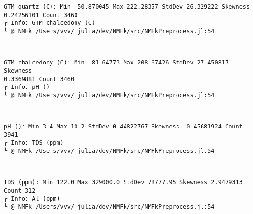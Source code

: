 \documentclass[11pt]{article}
\begin{document}
    \begin{Verbatim}[commandchars=\\\{\}]
GTM quartz (C): Min -50.870045 Max 222.28357 StdDev 26.329222 Skewness
0.24256101 Count 3460
┌ Info: GTM chalcedony (C)
└ @ NMFk /Users/vvv/.julia/dev/NMFk/src/NMFkPreprocess.jl:54
    \end{Verbatim}

    \begin{center}
    \end{center}
    { \hspace*{\fill} \\}
    
    \begin{Verbatim}[commandchars=\\\{\}]
GTM chalcedony (C): Min -81.64773 Max 208.67426 StdDev 27.450817 Skewness
0.3369881 Count 3460
┌ Info: pH ()
└ @ NMFk /Users/vvv/.julia/dev/NMFk/src/NMFkPreprocess.jl:54
    \end{Verbatim}

    \begin{center}
    \end{center}
    { \hspace*{\fill} \\}
    
    \begin{Verbatim}[commandchars=\\\{\}]
pH (): Min 3.4 Max 10.2 StdDev 0.44822767 Skewness -0.45681924 Count 3941
┌ Info: TDS (ppm)
└ @ NMFk /Users/vvv/.julia/dev/NMFk/src/NMFkPreprocess.jl:54
    \end{Verbatim}

    \begin{center}
    \end{center}
    { \hspace*{\fill} \\}
    
    \begin{Verbatim}[commandchars=\\\{\}]
TDS (ppm): Min 122.0 Max 329000.0 StdDev 78777.95 Skewness 2.9479313 Count 312
┌ Info: Al (ppm)
└ @ NMFk /Users/vvv/.julia/dev/NMFk/src/NMFkPreprocess.jl:54
    \end{Verbatim}
\end{document}
